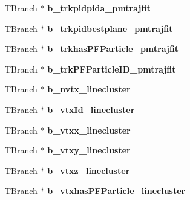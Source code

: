 \begin{DoxyCompactItemize}
\item 
\hypertarget{classanatree_acdf6bfe08dc310159742a57820b1f3c8}{T\-Branch $\ast$ {\bfseries b\-\_\-trkpidpida\-\_\-pmtrajfit}}\label{classanatree_acdf6bfe08dc310159742a57820b1f3c8}

\item 
\hypertarget{classanatree_af6458101534e3a5d775a7bb56ea3d6b3}{T\-Branch $\ast$ {\bfseries b\-\_\-trkpidbestplane\-\_\-pmtrajfit}}\label{classanatree_af6458101534e3a5d775a7bb56ea3d6b3}

\item 
\hypertarget{classanatree_a6677386ec3d5729b7aa090e966fec390}{T\-Branch $\ast$ {\bfseries b\-\_\-trkhas\-P\-F\-Particle\-\_\-pmtrajfit}}\label{classanatree_a6677386ec3d5729b7aa090e966fec390}

\item 
\hypertarget{classanatree_a136a913b9d50584ed3ed9dd179b8c40c}{T\-Branch $\ast$ {\bfseries b\-\_\-trk\-P\-F\-Particle\-I\-D\-\_\-pmtrajfit}}\label{classanatree_a136a913b9d50584ed3ed9dd179b8c40c}

\item 
\hypertarget{classanatree_a2bb40de0d9f4f4d2fc7bd613844f13dc}{T\-Branch $\ast$ {\bfseries b\-\_\-nvtx\-\_\-linecluster}}\label{classanatree_a2bb40de0d9f4f4d2fc7bd613844f13dc}

\item 
\hypertarget{classanatree_a7e4747bf23b621e3ee271b139dde3aef}{T\-Branch $\ast$ {\bfseries b\-\_\-vtx\-Id\-\_\-linecluster}}\label{classanatree_a7e4747bf23b621e3ee271b139dde3aef}

\item 
\hypertarget{classanatree_a70a10fadb07e0dff76a00e9f02cdb4a4}{T\-Branch $\ast$ {\bfseries b\-\_\-vtxx\-\_\-linecluster}}\label{classanatree_a70a10fadb07e0dff76a00e9f02cdb4a4}

\item 
\hypertarget{classanatree_ae988c6b98b169d589d76fbba72821617}{T\-Branch $\ast$ {\bfseries b\-\_\-vtxy\-\_\-linecluster}}\label{classanatree_ae988c6b98b169d589d76fbba72821617}

\item 
\hypertarget{classanatree_a7bb5fd32ae386693303961790df1837a}{T\-Branch $\ast$ {\bfseries b\-\_\-vtxz\-\_\-linecluster}}\label{classanatree_a7bb5fd32ae386693303961790df1837a}

\item 
\hypertarget{classanatree_ab07e8c7a037d98f785e11583317aab19}{T\-Branch $\ast$ {\bfseries b\-\_\-vtxhas\-P\-F\-Particle\-\_\-linecluster}}\label{classanatree_ab07e8c7a037d98f785e11583317aab19}


\end{DoxyCompactItemize}
